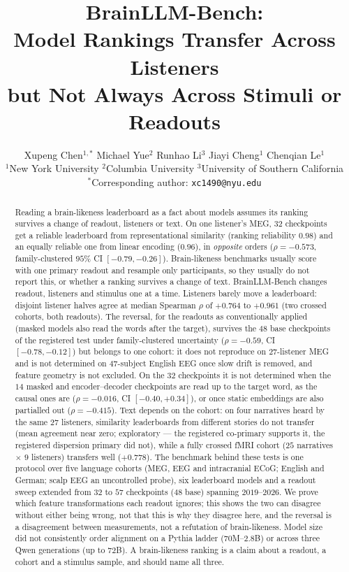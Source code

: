 \documentclass{article}
\title{BrainLLM-Bench:\\
Model Rankings Transfer Across Listeners\\
but Not Always Across Stimuli or Readouts}
\author{Xupeng Chen$^{1,*}$ \quad Michael Yue$^{2}$ \quad Runhao Li$^{3}$ \quad Jiayi Cheng$^{1}$ \quad Chenqian Le$^{1}$ \\
{\normalfont $^{1}$New York University \quad $^{2}$Columbia University \quad $^{3}$University of Southern California} \\
{\normalfont $^{*}$Corresponding author: \texttt{xc1490@nyu.edu}}}
\begin{document}
\maketitle

\begin{abstract}
Reading a brain-likeness leaderboard as a fact about models assumes its ranking survives a
change of readout, listeners or text. On one listener's MEG, $32$ checkpoints get a
reliable leaderboard from representational similarity (ranking reliability $0.98$) and an equally
reliable one from linear encoding ($0.96$), in \emph{opposite} orders ($\rho = -0.573$, family-clustered $95\%$ CI $[-0.79, -0.26]$). Brain-likeness benchmarks usually score with one primary readout and resample
only participants, so they usually do not report this, or whether a ranking survives a change of text.
BrainLLM-Bench changes readout, listeners and stimulus one at a time. Listeners barely move a
leaderboard: disjoint listener halves agree at median Spearman $\rho$ of $+0.764$ to $+0.961$ (two
crossed cohorts, both readouts). The reversal, for the readouts as conventionally applied (masked
models also read the words after the target),
survives the $48$ base checkpoints of the registered test under family-clustered uncertainty ($\rho = -0.59$, CI $[-0.78, -0.12]$) but belongs to one cohort: it does not reproduce on $27$-listener
MEG and is not determined on $47$-subject English EEG once slow drift is removed, and feature geometry is not excluded. On the $32$ checkpoints it is not
determined when the $14$ masked and encoder--decoder checkpoints are read up to the target word, as
the causal ones are ($\rho = -0.016$, CI $[-0.40, +0.34]$), or once static embeddings are also
partialled out ($\rho = -0.415$). Text depends on the cohort:
on four narratives heard by the same $27$ listeners, similarity leaderboards from different stories
do not transfer (mean agreement near zero; exploratory --- the registered co-primary supports it,
the registered dispersion primary did not), while a fully crossed fMRI cohort ($25$ narratives
$\times$ $9$ listeners) transfers well ($+0.778$). The benchmark behind these tests is one protocol
over five language cohorts (MEG, EEG and intracranial ECoG; English and German; scalp EEG an
uncontrolled probe), six leaderboard models and a readout sweep extended from $32$ to $57$
checkpoints ($48$ base) spanning $2019$--$2026$. We prove which feature transformations each
readout ignores; this shows the two can disagree without either being wrong, not that this is why
they disagree here, and the reversal is a disagreement between measurements, not a refutation of
brain-likeness. Model size did not consistently order alignment on a Pythia ladder ($70$M--$2.8$B)
or across three Qwen generations (up to $72$B). A brain-likeness ranking
is a claim about a readout, a cohort and a stimulus sample, and should name all three.
\end{abstract}
\end{document}
